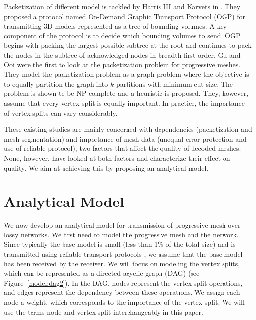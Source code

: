     
    Packetization of different model is tackled by
    Harris III and Karvets in \cite{harris:design}.   They proposed
    a protocol named On-Demand Graphic Transport Protocol (OGP)
    for transmitting 3D models represented as a tree of bounding volumes.
    A key component of the protocol is to decide which bounding volumes
    to send.  OGP begins with packing the largest possible subtree at
    the root and continues to pack the nodes in the subtree of
    acknowledged nodes in breadth-first order.  
    Gu and Ooi \cite{Gu:Packetization} were the first to look at
    the packetization problem for progressive meshes.  They model
    the packetization problem as a graph problem where the objective
    is to equally partition the graph into $k$ partitions with minimum
    cut size.  The problem is shown to be NP-complete and a heuristic
    is proposed.  They, however, assume that every vertex split is
    equally important.  In practice, the importance of vertex splits can
    vary considerably.  

    These existing studies are mainly concerned with dependencies
    (packetization and mesh segmentation) and importance
    of mesh data (unequal error protection and use of reliable protocol), 
    two factors that affect the quality of decoded meshes.  None, however,
    have looked at both factors and characterize 
    their effect on quality.  We aim at achieving this by proposing
    an analytical model.

\section{Analytical Model}
\label{s:model:model}
    We now develop an analytical model for transmission of
    progressive mesh over lossy networks.  We first need to model
    the progressive mesh and the network.  Since typically
    the base model is small (less than 1\% of the total size) 
    and is transmitted using reliable
    transport protocols \cite{3tpregib}, we assume that the
    base model has been received by the
    receiver. We will focus on modeling the vertex splits,
    which can be represented as a directed acyclic graph (DAG)
    (see Figure~\ref{model:dag2}). In the DAG, nodes represent
    the vertex split operations, and edges represent the dependency
    between these operations. We assign each node a weight,
    which corresponds to the importance of the vertex split.
    We will use the terms node and vertex split interchangeably
    in this paper.

